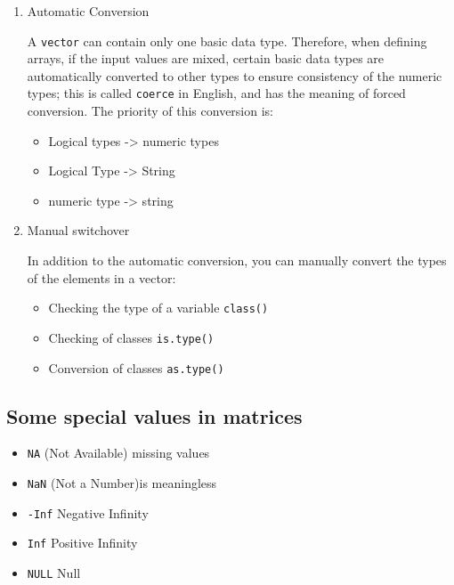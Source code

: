 \documentclass[
]{article}
\begin{document}
\begin{enumerate}
\def\labelenumi{\arabic{enumi}.}
\item
  Automatic Conversion

  A \texttt{vector} can contain only one basic data type. Therefore,
  when defining arrays, if the input values are mixed, certain basic
  data types are automatically converted to other types to ensure
  consistency of the numeric types; this is called \texttt{coerce} in
  English, and has the meaning of forced conversion. The priority of
  this conversion is:

  \begin{itemize}
  \item
    Logical types -\textgreater{} numeric types
  \item
    Logical Type -\textgreater{} String
  \item
    numeric type -\textgreater{} string
  \end{itemize}
\item
  Manual switchover

  In addition to the automatic conversion, you can manually convert the
  types of the elements in a vector:

  \begin{itemize}
  \item
    Checking the type of a variable \texttt{class()}
  \item
    Checking of classes \texttt{is.type()}
  \item
    Conversion of classes \texttt{as.type()}
  \end{itemize}
\end{enumerate}

\hypertarget{some-special-values-in-matrices}{%
\subsection{Some special values in
matrices}\label{some-special-values-in-matrices}}

\begin{itemize}
\item
  \texttt{NA} (Not Available) missing values
\item
  \texttt{NaN} (Not a Number)is meaningless
\item
  \texttt{-Inf} Negative Infinity
\item
  \texttt{Inf} Positive Infinity
\item
  \texttt{NULL} Null
\end{itemize}
\end{document}
